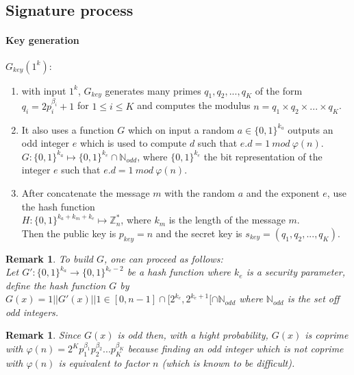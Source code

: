 \documentclass[a4paper,11pt]{article}
\newtheorem{remark}[theorem]{Remark}
\begin{document}
\subsection{Signature process }\label{sec:three:1}

\paragraph{Key generation}  $G_{key}(1^{k}):$

\label{Key generation 1}
\begin{enumerate}
\item  with input $1^k$, $G_{key}$ generates many primes $q_1,q_2,...,q_K$ of the form $q_i=2p_i^{\beta_i}+1$ for $1\leq i \leq K$ and computes the modulus $n=q_1\times q_2\times ...\times q_K$.
\item  It also uses a function $G$ which on input a random $a \in \{0,1\}^{k_a}$ outputs an odd integer $e$ which is used to compute $d$ such that $e.d=1 \ mod \ \varphi(n)$.\\
$G:\{0,1\}^{k_a}\stackrel{}{\longmapsto}\{0,1\}^{k_e}\cap \mathbb{N}_{odd}$, where  $ \{0,1\}^{k_e}$ the bit representation of the integer $e$ such that $e.d=1 \ mod \ \varphi(n)$.
\item After concatenate the message $m$ with the random $a$ and the exponent $e$, use the hash function\\ $H:\{0,1\}^{k_a+k_m+k_e}\stackrel{}{\longmapsto}\mathbb Z_n^*$, where $k_m$ is the length of the message $m$.\\
Then the public key is $p_{key}=n$ and the secret key is $s_{key}=(q_1,q_2,...,q_K)$.
\end{enumerate}
 
\begin{remark} To build $G$, one can proceed as follows:\\
 Let $ G': \{0, 1\}^{k_{a}} \rightarrow  \{0,1\}^{k_{e}-2}$ be a hash function where $k_{e}$ is a security parameter,
define the hash function  $G$  by $G(x)=1||G'(x)||1 \in [0, n-1] \cap [ 2^{k_{e}}, 2^{k_{e}+1}[\cap \mathbb{N}_{odd} $ where $\mathbb{N}_{odd} $ is the set off odd integers.
\end{remark}

\begin{remark}
Since $G(x)$ is odd then, with a hight probability, $G(x)$ is coprime with $\varphi(n)=2^Kp^{\beta_{1}}_{1}p^{\beta_{2}}_{2}...p^{\beta_K}_K$ because finding an odd integer which is not coprime with $\varphi(n)$ is equivalent to factor $n$ (which is known to be difficult).
\end{remark}
\end{document}
